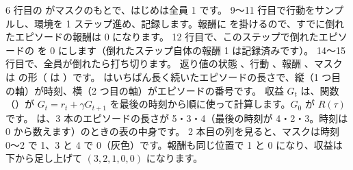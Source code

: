 6 行目の  がマスクのもとで、はじめは全員 1 です。
9〜11 行目で行動をサンプルし、環境を 1 ステップ進め、記録します。報酬に  を掛けるので、すでに倒れたエピソードの報酬は 0 になります。
12 行目で、このステップで倒れたエピソードの  を 0 にします（倒れたステップ自体の報酬 1 は記録済みです）。
14〜15 行目で、全員が倒れたら打ち切ります。
返り値の状態 、行動 、報酬 、マスク  は  の形（ は ）です。
 はいちばん長く続いたエピソードの長さで、縦（1 つ目の軸）が時刻、横（2 つ目の軸）がエピソードの番号です。
収益 $G_t$ は、関数 （）が $G_t=r_t+\gamma G_{t+1}$ を最後の時刻から順に使って計算します。$G_0$ が $R(\tau)$ です。
は、3 本のエピソードの長さが 5・3・4（最後の時刻が 4・2・3。時刻は 0 から数えます）のときの表の中身です。
2 本目の列を見ると、マスクは時刻 0〜2 で 1、3 と 4 で 0（灰色）です。報酬も同じ位置で 1 と 0 になり、収益は下から足し上げて $(3,2,1,0,0)$ になります。

